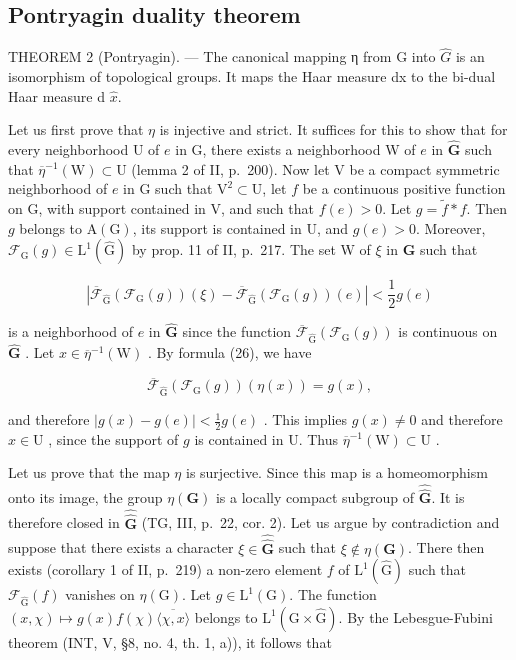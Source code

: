 \subsection{Pontryagin duality theorem}

THEOREM 2 (Pontryagin). --- The canonical mapping η from G into \(\widehat{G}\) is an isomorphism of topological groups. It maps the Haar measure dx to the bi-dual Haar measure d \(\widehat{x}\).

Let us first prove that \(\eta\) is injective and strict. It suffices for this to show that for every neighborhood U of \(e\) in G, there exists a neighborhood W of \(e\) in \(\widehat{\mathbf{G}}\) such that \(\overline{\eta}^{-1}(\mathrm{W})\subset \mathrm{U}\) (lemma 2 of II, p.~200). Now let V be a compact symmetric neighborhood of \(e\) in G such that \(\mathrm{V}^2\subset \mathrm{U}\), let \(f\) be a continuous positive function on G, with support contained in V, and such that \(f(e) > 0\). Let \(g = \widetilde{f}*f\). Then \(g\) belongs to \(\mathrm{A}(\mathrm{G})\), its support is contained in U, and \(g(e) > 0\). Moreover, \(\mathcal{F}_{\mathrm{G}}(g)\in \mathrm{L}^{1}(\widehat{\mathrm{G}})\) by prop. 11 of II, p.~217. The set W of \(\xi\) in \(\widehat{\mathbf{G}}\) such that

\[
\left| \overline {{\mathcal {F}}} _ {\widehat {\mathrm{G}}} (\mathcal {F} _ {\mathrm{G}} (g)) (\xi) - \overline {{\mathcal {F}}} _ {\widehat {\mathrm{G}}} (\mathcal {F} _ {\mathrm{G}} (g)) (e) \right| <   \frac {1}{2} g (e)
\]

is a neighborhood of \(e\) in \(\widehat{\mathbf{G}}\) since the function \(\overline{\mathcal{F}}_{\widehat{\mathrm{G}}}(\mathcal{F}_{\mathrm{G}}(g))\) is continuous on \(\widehat{\mathbf{G}}\) . Let \(x \in \overline{\eta}^{-1}(\mathrm{W})\) . By formula (26), we have

\[
\overline {{\mathcal {F}}} _ {\widehat {\mathrm{G}}} (\mathcal {F} _ {\mathrm{G}} (g)) (\eta (x)) = g (x),
\]

and therefore \(|g(x) - g(e)| < \frac{1}{2} g(e)\) . This implies \(g(x) \neq 0\) and therefore \(x \in \mathrm{U}\) , since the support of \(g\) is contained in U. Thus \(\overline{\eta}^{-1}(\mathrm{W}) \subset \mathrm{U}\) .

Let us prove that the map \(\eta\) is surjective. Since this map is a homeomorphism onto its image, the group \(\eta(\mathbf{G})\) is a locally compact subgroup of \(\widehat{\widehat{\mathbf{G}}}\). It is therefore closed in \(\widehat{\widehat{\mathbf{G}}}\) (TG, III, p.~22, cor. 2). Let us argue by contradiction and suppose that there exists a character \(\xi \in \widehat{\widehat{\mathbf{G}}}\) such that \(\xi \notin \eta(\mathbf{G})\). There then exists (corollary 1 of II, p.~219) a non-zero element \(f\) of \(\mathrm{L}^1(\widehat{\mathrm{G}})\) such that \(\mathcal{F}_{\widehat{\mathrm{G}}} (f)\) vanishes on \(\eta(\mathrm{G})\). Let \(g \in \mathrm{L}^1(\mathrm{G})\). The function \((x, \chi) \mapsto g(x)f(\chi)\overline{\langle\chi,x\rangle}\) belongs to \(\mathrm{L}^1(\mathrm{G} \times \widehat{\mathrm{G}})\). By the Lebesgue-Fubini theorem (INT, V, §8, no. 4, th. 1, a)), it follows that

